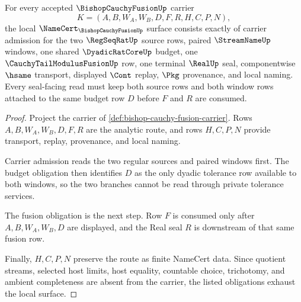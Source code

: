 \begin{theorem}
\label{thm:bishop-cauchy-fusion-namecert-obligations}
For every accepted $\BishopCauchyFusionUp$ carrier
$$
K=(A,B,W_A,W_B,D,F,R,H,C,P,N),
$$
the local $\NameCert_{\BishopCauchyFusionUp}$ surface consists exactly of carrier admission for the two $\RegSeqRatUp$ source rows, paired $\StreamNameUp$ windows, one shared $\DyadicRatCoreUp$ budget, one $\CauchyTailModulusFusionUp$ row, one terminal $\RealUp$ seal, componentwise $\hsame$ transport, displayed $\Cont$ replay, $\Pkg$ provenance, and local naming. Every seal-facing read must keep both source rows and both window rows attached to the same budget row $D$ before $F$ and $R$ are consumed.
\end{theorem}
\begin{proof}
Project the carrier of \autoref{def:bishop-cauchy-fusion-carrier}. Rows $A,B,W_A,W_B,D,F,R$ are the analytic route, and rows $H,C,P,N$ provide transport, replay, provenance, and local naming.

Carrier admission reads the two regular sources and paired windows first. The budget obligation then identifies $D$ as the only dyadic tolerance row available to both windows, so the two branches cannot be read through private tolerance services.

The fusion obligation is the next step. Row $F$ is consumed only after $A,B,W_A,W_B,D$ are displayed, and the Real seal $R$ is downstream of that same fusion row.

Finally, $H,C,P,N$ preserve the route as finite NameCert data. Since quotient streams, selected host limits, host equality, countable choice, trichotomy, and ambient completeness are absent from the carrier, the listed obligations exhaust the local surface.
\end{proof}

